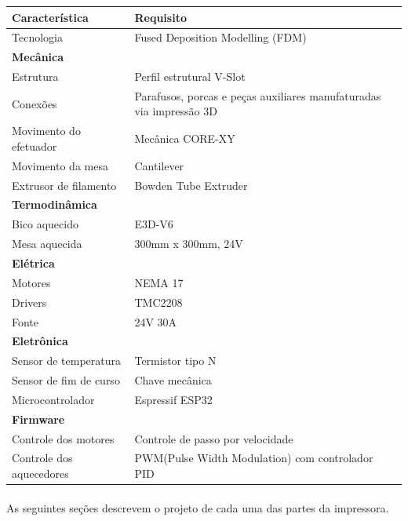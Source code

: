\documentclass[12pt, english]{article}
\begin{document}
\begin{center}
	\begin{tabularx}{\linewidth}{lX}
	\toprule
	\textbf{Característica} & \textbf{Requisito}\\
	\midrule
	Tecnologia & Fused Deposition Modelling (FDM) \\
	\addlinespace
	\textbf{Mecânica}\\
	\midrule
	Estrutura & Perfil estrutural V-Slot \\
	Conexões & Parafusos, porcas e peças auxiliares manufaturadas via impressão 3D\\
	Movimento do efetuador & Mecânica CORE-XY \\
	Movimento da mesa & Cantilever \\
	Extrusor de filamento & Bowden Tube Extruder \\
	\addlinespace
	\textbf{Termodinâmica}\\
	\midrule
	Bico aquecido & E3D-V6 \\
	Mesa aquecida & 300mm x 300mm, 24V \\
	\addlinespace
	\textbf{Elétrica}\\
	\midrule
	Motores & NEMA 17 \\
	Drivers & TMC2208 \\
	Fonte & 24V 30A \\
	\addlinespace
	\textbf{Eletrônica}\\
	\midrule
	Sensor de temperatura & Termistor tipo N \\
	Sensor de fim de curso & Chave mecânica \\
	Microcontrolador & Espressif ESP32 \\
	\addlinespace
	\textbf{Firmware}\\
	\midrule
	Controle dos motores & Controle de passo por velocidade \\
	Controle dos aquecedores & PWM(Pulse Width Modulation) com controlador PID \\

	\bottomrule
	\end{tabularx}
\end{center}

\paragraph{}
As seguintes seções descrevem o projeto de cada uma das partes da impressora.
\pagebreak
\end{document}
